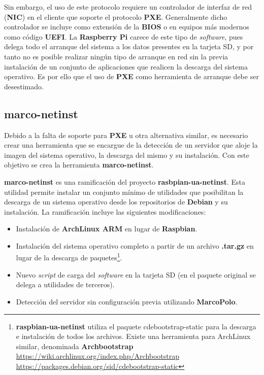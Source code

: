 Sin embargo, el uso de este protocolo requiere un controlador de interfaz de red (\textbf{NIC}) en el cliente que soporte el protocolo \textbf{PXE}. Generalmente dicho controlador se incluye como extensión de la \textbf{BIOS} o en equipos más modernos como código \textbf{UEFI}. La \textbf{Raspberry Pi} carece de este tipo de \textit{software}, pues delega todo el arranque del sistema a los datos presentes en la tarjeta SD, y por tanto no es posible realizar ningún tipo de arranque en red sin la previa instalación de un conjunto de aplicaciones que realicen la descarga del sistema operativo. Es por ello que el uso de \textbf{PXE} como herramienta de arranque debe ser desestimado.

\subsection{marco-netinst}

Debido a la falta de soporte para \textbf{PXE} u otra alternativa similar, es necesario crear una herramienta que se encargue de la detección de un servidor que aloje la imagen del sistema operativo, la descarga del mismo y su instalación. Con este objetivo se crea la herramienta \textbf{marco-netinst}.

\textbf{marco-netinst} es una ramificación del proyecto \textbf{rasbpian-ua-netinst}\cite{raspbian-ua-netinst}. Esta utilidad permite instalar un conjunto mínimo de utilidades que posibilitan la descarga de un sistema operativo desde los repositorios de \textbf{Debian} y su instalación. La ramificación incluye las siguientes modificaciones:

\begin{itemize}
	\item Instalación de \textbf{ArchLinux ARM} en lugar de \textbf{Raspbian}.
	\item Instalación del sistema operativo completo a partir de un archivo \textbf{.tar.gz} en lugar de la descarga de paquetes\footnote{\textbf{raspbian-ua-netinst} utiliza el paquete cdebootstrap-static para la descarga e instalación de todos los archivos. Existe una herramienta para ArchLinux similar, denominada \textbf{Archbootstrap}\\
	\href{https://wiki.archlinux.org/index.php/Archbootstrap}{https://wiki.archlinux.org/index.php/Archbootstrap}\\
	\href{https://packages.debian.org/sid/cdebootstrap-static}{https://packages.debian.org/sid/cdebootstrap-static}}.
	\item Nuevo \textit{script} de carga del \textit{software} en la tarjeta SD (en el paquete original se delega a utilidades de terceros).
	\item Detección del servidor sin configuración previa utilizando \textbf{MarcoPolo}.
\end{itemize}

